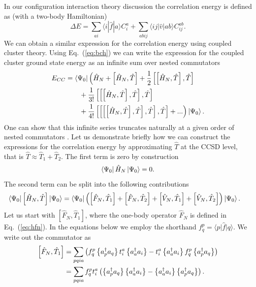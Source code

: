   In our configuration interaction theory discussion the correlation energy is defined as (with a two-body Hamiltonian) 
  \[
  \Delta E=\sum_{ai}\langle i| \hat{f}|a \rangle C_{i}^{a}+
  \sum_{abij}\langle ij | \hat{v}| ab \rangle C_{ij}^{ab}.
  \]
We can obtain a similar expression for the correlation energy using coupled cluster theory. 
Using Eq.~(\ref{eq:bch}) we can write the expression for the coupled cluster  ground state energy as an infinite sum over nested commutators
        \begin{align*}
            E_{CC} &= \bra{\Psi_0}\Bigl( \hat{H}_N + \left[ \hat{H}_N, \hat{T} \right] +
                \frac{1}{2} \left[\left[ \hat{H}_N, \hat{T} \right], \hat{T}\right] \\
                & \qquad + \frac{1}{3!} \left[ \left[\left[ \hat{H}_N, \hat{T} \right], \hat{T}\right], \hat{T} \right] \\
                & \qquad + \frac{1}{4!} \left[ \left[ \left[\left[ \hat{H}_N, \hat{T} \right], \hat{T}\right], \hat{T} \right], \hat{T} \right] +... \Bigr) \ket{\Psi_0}. \\
        \end{align*}
One can show that this infinite series truncates naturally at a given order of nested commutators \cite{shavittbartlett2009}. 
Let us demonstrate briefly how we can construct the expressions for the correlation 
energy by approximating $\hat{T}$ at the CCSD level, that is $\hat{T}\approx \hat{T}_1+\hat{T}_2$.
        The first term is zero by construction
        \begin{equation*}
            \bra{\Psi_0} \hat{H}_N \ket{\Psi_0} = 0.
        \end{equation*}       
     The second term can be split into the following contributions
        \begin{align*}
        \bra{\Psi_0}\left[ \hat{H}_N, \hat{T} \right]\ket{\Psi_0} & = 
            \bra{\Psi_0} \Bigl(\left[ \hat{F}_N, \hat{T}_1 \right] + \left[ \hat{F}_N, \hat{T}_2 \right]
            + \left[ \hat{V}_N, \hat{T}_1 \right] + \left[ \hat{V}_N, \hat{T}_2 \right] \Bigr) \ket{\Psi_0}.
    \end{align*}
Let us start with $\left[ \hat{F}_N, \hat{T}_1 \right]$, where the one-body operator $\hat{F}_N$ is defined in Eq.~(\ref{eq:hfn}). 
In the equations below we employ the shorthand $f^p_q = \langle p\vert \hat{f} \vert q\rangle$.  
We write out the commutator  as
    \begin{align*}
        \left[ \hat{F}_N, \hat{T}_1 \right] &= \sum_{pqia} \left(f_q^p \left\{a_p^\dagger a_q\right\} 
            t_i^a \left\{a_a^\dagger a_i\right\} - t_i^a \left\{a_a^\dagger a_i\right\} f_q^p \left\{a_p^\dagger a_q\right\} \right) \\
        &= \sum_{pqia} f_q^p t_i^a \left( \left\{a_p^\dagger a_q\right\} \left\{a_a^\dagger a_i\right\} -
                \left\{a_a^\dagger a_i\right\} \left\{a_p^\dagger a_q\right\} \right).
    \end{align*}
